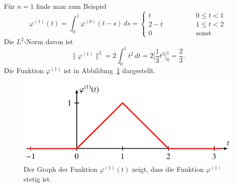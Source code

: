 \begin{beispiel}
Für $n=1$ finde man zum Beispiel
\[
\varphi^{(1)}(t)
=
\int_0^1 \varphi^{(0)}(t-s)\,ds
=
\begin{cases}
t\qquad\qquad&0\le t<1\\
2-t\qquad\qquad&1\le t<2\\
0\qquad\qquad&\text{sonst}
\end{cases}
\]
Die $L^2$-Norm davon ist
\[
\| \varphi^{(1)}\|^2
=
2
\int_0^1 t^2\,dt
=
2\biggl[\frac13t^3\biggr]_0^1
=
\frac23.
\]
Die Funktion $\varphi^{(1)}$ ist in Abbildung~\ref{spline:phi1}
dargestellt.
\begin{figure}
\centering
\includegraphics{chapters/9-spline/images/phi1.pdf}
\caption{Der Graph der Funktion $\varphi^{(1)}(t)$ zeigt, dass die
Funktion $\varphi^{(1)}$ stetig ist.
\label{spline:phi1}}
\end{figure}
\end{beispiel}

